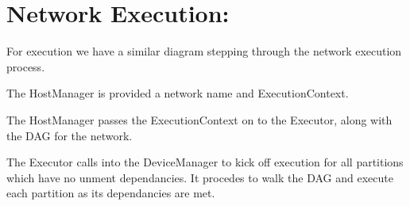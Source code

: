 \section*{Network Execution\+:}

For execution we have a similar diagram stepping through the network execution process.
\begin{DoxyItemize}
\item The Host\+Manager is provided a network name and Execution\+Context.
\item The Host\+Manager passes the Execution\+Context on to the Executor, along with the D\+AG for the network.
\item The Executor calls into the Device\+Manager to kick off execution for all partitions which have no unment dependancies. It procedes to walk the D\+AG and execute each partition as its dependancies are met.
\end{DoxyItemize}

 